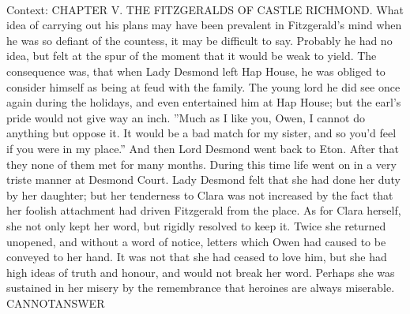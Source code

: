 \documentclass[11pt,a4paper, onecolumn]{article}
\begin{document}
\\ Context: CHAPTER V. THE FITZGERALDS OF CASTLE RICHMOND. What idea of carrying out his plans may have been prevalent in Fitzgerald's mind when he was so defiant of the countess, it may be difficult to say. Probably he had no idea, but felt at the spur of the moment that it would be weak to yield. The consequence was, that when Lady Desmond left Hap House, he was obliged to consider himself as being at feud with the family. The young lord he did see once again during the holidays, and even entertained him at Hap House; but the earl's pride would not give way an inch. ''Much as I like you, Owen, I cannot do anything but oppose it. It would be a bad match for my sister, and so you'd feel if you were in my place.'' And then Lord Desmond went back to Eton. After that they none of them met for many months. During this time life went on in a very triste manner at Desmond Court. Lady Desmond felt that she had done her duty by her daughter; but her tenderness to Clara was not increased by the fact that her foolish attachment had driven Fitzgerald from the place. As for Clara herself, she not only kept her word, but rigidly resolved to keep it. Twice she returned unopened, and without a word of notice, letters which Owen had caused to be conveyed to her hand. It was not that she had ceased to love him, but she had high ideas of truth and honour, and would not break her word. Perhaps she was sustained in her misery by the remembrance that heroines are always miserable. CANNOTANSWER
\end{document}
